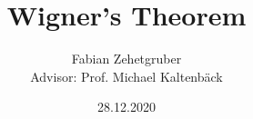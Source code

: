 \documentclass{article}
\title
{
  Wigner's Theorem
}
\author
{
  Fabian Zehetgruber \\ [1cm]{\small Advisor: Prof. Michael Kaltenbäck}
}
\date{28.12.2020}
\begin{document}
	
\maketitle









\medskip

\printbibliography
\end{document}
